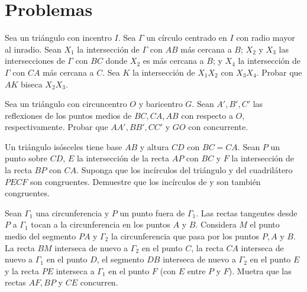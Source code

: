 \newpage
\section{Problemas}

\begin{section-problem}
    Sea  un triángulo con incentro $I$.
    Sea $\Gamma$ un círculo centrado en $I$ con radio mayor al inradio.
    Sean $X_1$ la intersección de $\Gamma$ con $AB$ más cercana a $B$; $X_2$ y $X_3$ las intersecciones de $\Gamma$ con $BC$ donde $X_2$ es más cercana a $B$; y $X_4$ la intersección de $\Gamma$ con $CA$ más cercana a $C$.
    Sea $K$ la intersección de $X_1 X_2$ con $X_3 X_4$.
    Probar que $AK$ biseca $X_2 X_3$.
\end{section-problem}

\begin{section-problem}
    Sea  un triángulo con circuncentro $O$ y baricentro $G$.
    Sean $A', B', C'$ las reflexiones de los puntos medios de $BC, CA, AB$ con respecto a $O$, respectivamente.
    Probar que $AA', BB', CC'$ y $GO$ con concurrente.
\end{section-problem}

\begin{section-problem}
    Un triángulo isósceles  tiene base $AB$ y altura $CD$ con $BC = CA$.
    Sean $P$ un punto sobre $CD$, $E$ la intersección de la recta $AP$ con $BC$ y $F$ la intersección de la recta $BP$ con $CA$.
    Suponga que los incírculos del triángulo  y del cuadrilátero $PECF$ son congruentes.
    Demuestre que los incírculos de  y  son también congruentes.
\end{section-problem}

\begin{section-problem}
    Sean $\Gamma_1$ una circunferencia y $P$ un punto fuera de $\Gamma_1$.
    Las rectas tangentes desde $P$ a $\Gamma_1$ tocan a la circunferencia en los puntos $A$ y $B$.
    Considera $M$ el punto medio del segmento $PA$ y $\Gamma_2$ la circunferencia que pasa por los puntos $P, A$ y $B$.
    La recta $BM$ interseca de nuevo a $\Gamma_2$ en el punto $C$, la recta $CA$ interseca de nuevo a $\Gamma_1$ en el punto $D$, el segmento $DB$ interseca de nuevo a $\Gamma_2$ en el punto $E$ y la recta $PE$ interseca a $\Gamma_1$ en el punto $F$ (con $E$ entre $P$ y $F$).
    Muetra que las rectas $AF, BP$ y $CE$ concurren.
\end{section-problem}

